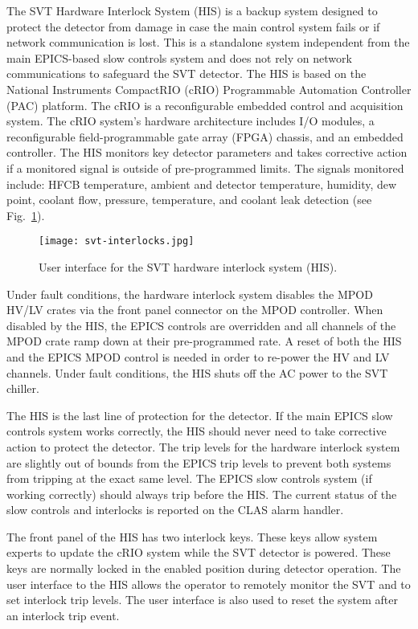 The SVT Hardware Interlock System (HIS) is a backup system designed to protect the detector from damage in case the main control system fails or if network communication is lost. This is a standalone system independent from the main EPICS-based slow controls system and does not rely on network communications to safeguard the SVT detector. The HIS is based on the National Instruments CompactRIO (cRIO) Programmable Automation Controller (PAC) platform. The cRIO is a reconfigurable embedded control and acquisition system. The cRIO system's hardware architecture includes I/O modules, a reconfigurable field-programmable gate array (FPGA) chassis, and an embedded controller. The HIS monitors key detector parameters and takes corrective action if a monitored signal is outside of pre-programmed limits. The signals monitored include: HFCB temperature, ambient and detector temperature, humidity, dew point, coolant flow, pressure, temperature, and coolant leak detection (see Fig.~\ref{fig:svt-interlocks}). 

\begin{figure}[hbt] 
\centering 
\texttt{[image: svt-interlocks.jpg]}
\caption{User interface for the SVT hardware interlock system (HIS).}
\label{fig:svt-interlocks}
\end{figure}

Under fault conditions, the hardware interlock system disables the MPOD HV/LV crates via the front panel connector on the MPOD controller. When disabled by the HIS, the EPICS controls are overridden and all channels of the MPOD crate ramp down at their pre-programmed rate. A reset of both the HIS and the EPICS MPOD control is needed in order to re-power the HV and LV channels. Under fault conditions, the HIS shuts off the AC power to the SVT chiller. 

The HIS is the last line of protection for the detector. If the main EPICS slow controls system works correctly, the HIS should never need to take corrective action to protect the detector. The trip levels for the hardware interlock system are slightly out of bounds from the EPICS trip levels to prevent both systems from tripping at the exact same level. The EPICS slow controls system (if working correctly) should always trip before the HIS. The current status of the slow controls and interlocks is reported on the CLAS alarm handler. 

The front panel of the HIS has two interlock keys. These keys allow system experts to update the cRIO system while the SVT detector is powered. These keys are normally locked in the enabled position during detector operation.
The user interface to the HIS allows the operator to remotely monitor the SVT and to set interlock trip levels. The user interface is also used to reset the system after an interlock trip event. 

